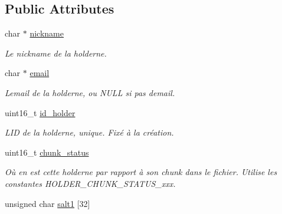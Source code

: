 \subsection*{Public Attributes}
\begin{DoxyCompactItemize}
\item 
\mbox{\label{classt__holder_a71a34bd7bad474898cfba872930b27ce}} 
char $\ast$ \hyperlink{classt__holder_a71a34bd7bad474898cfba872930b27ce}{nickname}
\begin{DoxyCompactList}\small\item\em Le nickname de la holderne. \end{DoxyCompactList}\item 
\mbox{\label{classt__holder_a506b27b697fd6517c34778dff6a6e69b}} 
char $\ast$ \hyperlink{classt__holder_a506b27b697fd6517c34778dff6a6e69b}{email}
\begin{DoxyCompactList}\small\item\em L\textquotesingle{}email de la holderne, ou N\+U\+LL si pas d\textquotesingle{}email. \end{DoxyCompactList}\item 
\mbox{\label{classt__holder_abd8642ba4e6c9fb50d7cd874dbcf27c1}} 
uint16\+\_\+t \hyperlink{classt__holder_abd8642ba4e6c9fb50d7cd874dbcf27c1}{id\+\_\+holder}
\begin{DoxyCompactList}\small\item\em L\textquotesingle{}ID de la holderne, unique. Fixé à la création. \end{DoxyCompactList}\item 
\mbox{\label{classt__holder_a5dcd5b0a7488b64b6ac51dfdc6a4b8ac}} 
uint16\+\_\+t \hyperlink{classt__holder_a5dcd5b0a7488b64b6ac51dfdc6a4b8ac}{chunk\+\_\+status}
\begin{DoxyCompactList}\small\item\em Où en est cette holderne par rapport à son chunk dans le fichier. Utilise les constantes H\+O\+L\+D\+E\+R\+\_\+\+C\+H\+U\+N\+K\+\_\+\+S\+T\+A\+T\+U\+S\+\_\+xxx. \end{DoxyCompactList}\item 
\mbox{\label{classt__holder_ac8652a9b7c720e24f221ef5826b8912d}} 
unsigned char \hyperlink{classt__holder_ac8652a9b7c720e24f221ef5826b8912d}{salt1} \mbox{[}32\mbox{]}

\end{DoxyCompactItemize}
